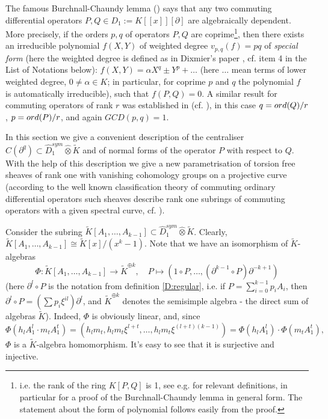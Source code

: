 \documentclass[11pt]{article}
\theoremstyle{definition}
\newcommand{\ord}{\mathop{\rm ord}\nolimits}
\theoremstyle{plain}
\numberwithin{equation}{section}
\begin{document}
The famous Burchnall-Chaundy lemma (\cite{BC1}) says  that any two commuting differential operators $P,Q\in D_1:=K[[x]][\partial ]$ are algebraically dependent. More precisely, if the orders $p,q$ of operators $P,Q$ are coprime\footnote{i.e. the rank of the ring $K[P,Q]$ is 1, see e.g. \cite{Zheglov_book} for relevant definitions, in particular \cite[Lemma 5.23]{Zheglov_book} for a proof of the Burchnall-Chaundy lemma in general form. The statement about the form of polynomial follows easily from the proof.}, then there exists an irreducible polynomial $f(X,Y)$ of weighted degree $v_{p,q}(f)=pq$ of {\it special form} (here the weighted degree is defined as in Dixmier's paper \cite{Dixmier}, cf. item 4 in the List of Notations below): $f(X,Y) = \alpha X^q\pm Y^p+\ldots $ (here $\ldots$ mean terms of lower weighted degree, $0\neq\alpha\in K$; in particular, for coprime $p$ and $q$ the polynomial $f$ is automatically irreducible), such that $f(P,Q)=0$. A similar result for commuting operators of rank $r$ was established in \cite{Wilson} (cf. \cite[Th. 2.11]{Previato2019}), in this case $q=\ord (Q)/r$, $p=\ord (P)/r$, and again $GCD (p,q)=1$.

In this section we give a convenient description of the centraliser $C(\partial^q)\subset \hat{D}_1^{sym}\hat{\otimes}\tilde{K}$ and of normal forms of the operator $P$ with respect to $Q$. With the help of this description we give a new parametrisation of torsion free sheaves of rank one with vanishing cohomology groups on a projective  curve (according to the well known classification theory of commuting ordinary differential operators such sheaves describe rank one subrings of commuting operators with a given spectral curve, cf. \cite[Th. 10.26]{Zheglov_book}).


Consider the subring $\tilde{K}[A_1,\ldots ,A_{k-1}] \subset \hat{D}_1^{sym}\hat{\otimes}\tilde{K}$. Clearly, $\tilde{K}[A_1,\ldots, A_{k-1}]\cong \tilde{K}[x]/(x^k-1)$. Note that we have an isomorphism of $\tilde{K}$-algebras 
$$
\Phi : \tilde{K}[A_1,\ldots ,A_{k-1}]\rightarrow \tilde{K}^{\oplus k} , \quad P\mapsto (1\circ P, \ldots , (\partial^{k-1}\circ P){\partial^{-k+1}})
$$
(here $\partial^l\circ P$ is the notation from definition \ref{D:regular}, i.e. if $P=\sum_{i=0}^{k-1}p_iA_i$, then $\partial^l\circ P=(\sum p_i\xi^{il}){\partial^{l}}$, and $\tilde{K}^{\oplus k}$ denotes the semisimple algebra - the direct sum of algebras $\tilde{K}$). Indeed, $\Phi$ is obviously linear, and, since  
$$
\Phi(h_{l}A_1^l\cdot m_{t}A_1^t)=(h_lm_t,h_lm_t\xi^{l+t},\ldots,h_lm_t\xi^{(l+t)(k-1)})=\Phi(h_{l}A_1^l)\cdot\Phi(m_{t}A_1^t),
$$
$\Phi$ is a $\tilde{K}$-algebra homomorphism. It's easy to see that it is surjective and injective. 
\end{document}
